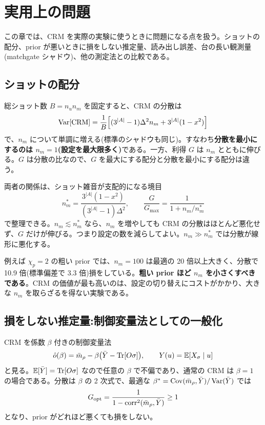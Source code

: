 \chapter{実用上の問題}
\label{ch:practical}

この章では、CRM を実際の実験に使うときに問題になる点を扱う。ショットの配分、prior が悪いときに損をしない推定量、読み出し誤差、台の長い観測量(matchgate シャドウ)、他の測定法との比較である。

\section{ショットの配分}
\label{sec:allocation}

総ショット数 $B=n_un_m$ を固定すると、CRM の分散は
\begin{equation}
  \operatorname{Var}[\text{CRM}]=\frac1B\Bigl[(3^{\lvert A\rvert}-1)\Delta^2n_m+3^{\lvert A\rvert}(1-x^2)\Bigr]
\end{equation}
で、$n_m$ について単調に増える(標準のシャドウも同じ)。すなわち\textbf{分散を最小にするのは $n_m=1$(設定を最大限多く)}である。一方、利得 $G$ は $n_m$ とともに伸びる。$G$ は分散の比なので、$G$ を最大にする配分と分散を最小にする配分は違う。

両者の関係は、ショット雑音が支配的になる境目
\begin{equation}
  n_m^\ast=\frac{3^{\lvert A\rvert}(1-x^2)}{(3^{\lvert A\rvert}-1)\Delta^2},\qquad\frac{G}{G_{\max}}=\frac{1}{1+n_m/n_m^\ast}
\end{equation}
で整理できる。$n_m\lesssim n_m^\ast$ なら、$n_m$ を増やしても CRM の分散はほとんど悪化せず、$G$ だけが伸びる。つまり設定の数を減らしてよい。$n_m\gg n_m^\ast$ では分散が線形に悪化する。

例えば $\chi_p=2$ の粗い prior では、$n_m=100$ は最適の 20 倍以上大きく、分散で 10.9 倍(標準偏差で 3.3 倍)損をしている。\textbf{粗い prior ほど $n_m$ を小さくすべきである}。CRM の価値が最も高いのは、設定の切り替えにコストがかかり、大きな $n_m$ を取らざるを得ない実験である。

\section{損をしない推定量:制御変量法としての一般化}
\label{sec:optbeta}

CRM を係数 $\beta$ 付きの制御変量法
\begin{equation}
  \hat o(\beta)=\bar m_\rho-\beta\bigl(\bar Y-\operatorname{Tr}[O\sigma]\bigr),\qquad Y(u)=\mathbb E[X_\sigma\mid u]
\end{equation}
と見る。$\mathbb E[\bar Y]=\operatorname{Tr}[O\sigma]$ なので任意の $\beta$ で不偏であり、通常の CRM は $\beta=1$ の場合である。分散は $\beta$ の 2 次式で、最適な $\beta^\ast=\operatorname{Cov}(\bar m_\rho,\bar Y)/\operatorname{Var}(\bar Y)$ では
\begin{equation}
  G_{\rm opt}=\frac{1}{1-\mathrm{corr}^2(\bar m_\rho,\bar Y)}\ge1
\end{equation}
となり、prior がどれほど悪くても損をしない。

